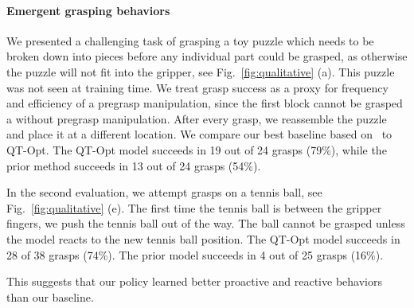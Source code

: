 \documentclass{article}
\begin{document}
\paragraph{Emergent grasping behaviors}
We presented a challenging task of grasping a toy puzzle which needs to be broken down into pieces before any individual part could be grasped, as otherwise the puzzle will not fit into the gripper, see Fig.~\ref{fig:qualitative} (a). This puzzle was not seen at training time. We treat grasp success as a proxy for frequency and efficiency of a pregrasp manipulation, since the first block cannot be grasped a without pregrasp manipulation. After every grasp, we reassemble the puzzle and place it at a different location. We compare our best baseline based on~\citet{levine16} to QT-Opt. The QT-Opt model succeeds in 19 out of 24 grasps (79\%), while the prior method succeeds in 13 out of 24 grasps (54\%).

In the second evaluation, we attempt grasps on a tennis ball, see Fig.~\ref{fig:qualitative} (e). The first time the tennis ball is between the gripper fingers, we push the tennis ball out of the way. The ball cannot be grasped unless the model reacts to the new tennis ball position. The QT-Opt model succeeds in 28 of 38 grasps (74\%). The prior model succeeds in 4 out of 25 grasps (16\%).

This suggests that our policy learned better proactive and reactive behaviors than our baseline.
\end{document}
